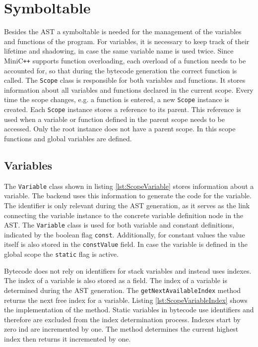 
\section{Symboltable}

Besides the AST a symboltable is needed for the management of the variables and functions of the program. For variables, it is necessary to keep track of their lifetime and shadowing, in case the same variable name is used twice. Since MiniC\verb|++| supports function overloading, each overload of a function needs to be accounted for, so that during the bytecode generation the correct function is called. The \verb|Scope| class is responsible for both variables and functions. It stores information about all variables and functions declared in the current scope. Every time the scope changes, e.g. a function is entered, a new \verb|Scope| instance is created. Each \verb|Scope| instance stores a reference to its parent. This reference is used when a variable or function defined in the parent scope needs to be accessed. Only the root instance does not have a parent scope. In this scope functions and global variables are defined.

\subsection{Variables}

The \verb|Variable| class shown in listing \ref{lst:ScopeVariable} stores information about a variable. The backend uses this information to generate the code for the variable. The identifier is only relevant during the AST generation, as it serves as the link connecting the variable instance to the concrete variable definition node in the AST. The \verb|Variable| class is used for both variable and constant definitions, indicated by the boolean flag \verb|const|. Additionally, for constant values the value itself is also stored in the \verb|constValue| field. In case the variable is defined in the global scope the \verb|static| flag is active. 

Bytecode does not rely on identifiers for stack variables and instead uses indexes. The index of a variable is also stored as a field. The index of a variable is determined during the AST generation. The \verb|getNextAvailableIndex| method returns the next free index for a variable. Listing \ref{lst:ScopeVariableIndex} shows the implementation of the method. Static variables in bytecode use identifiers and therefore are excluded from the index determination process. Indexes start by zero ind are incremented by one. The method determines the current highest index then returns it incremented by one. 


